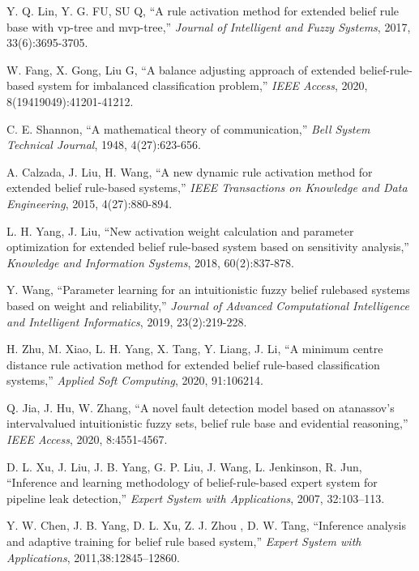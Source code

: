 \documentclass{ieeeaccess}
\begin{document}
\begin{thebibliography}{00}
     Y. Q. Lin, Y. G. FU, SU Q, ``A rule activation method for extended belief rule base with vp-tree and mvp-tree,''
    \emph{Journal of Intelligent and Fuzzy Systems},
    2017, 33(6):3695-3705.

     W. Fang, X. Gong, Liu G, ``A balance adjusting approach of extended
    belief-rule-based system for imbalanced classification problem,''
    \emph{IEEE Access},
    2020, 8(19419049):41201-41212.

     C. E. Shannon, ``A mathematical theory of communication,''
    \emph{Bell System Technical Journal},
    1948, 4(27):623-656.

     A. Calzada, J. Liu, H. Wang, ``A new dynamic rule activation
    method for extended belief rule-based systems,''
    \emph{IEEE Transactions on Knowledge and Data Engineering},
    2015, 4(27):880-894.

     L. H. Yang, J. Liu, ``New activation weight calculation and parameter optimization
    for extended belief rule-based system based on sensitivity analysis,''
    \emph{Knowledge and Information Systems},
    2018, 60(2):837-878.

     Y. Wang, ``Parameter learning for an intuitionistic fuzzy belief rulebased
    systems based on weight and reliability,''
    \emph{Journal of Advanced Computational Intelligence and Intelligent Informatics},
    2019, 23(2):219-228.

     H. Zhu, M. Xiao, L. H. Yang, X. Tang, Y. Liang, J. Li, ``A minimum centre distance rule activation method for extended
    belief rule-based classification systems,''
    \emph{Applied Soft Computing},
    2020, 91:106214.

     Q. Jia, J. Hu, W. Zhang, ``A novel fault detection model based on atanassov’s intervalvalued
    intuitionistic fuzzy sets, belief rule base and evidential reasoning,''
    \emph{IEEE Access}, 2020, 8:4551-4567.

     D. L. Xu, J. Liu, J. B. Yang, G. P. Liu, J. Wang, L. Jenkinson, R. Jun, ``Inference and learning methodology of belief-rule-based expert system for pipeline leak detection,''
    \emph{Expert System with Applications}, 2007, 32:103–113.

     Y. W. Chen, J. B. Yang, D. L. Xu, Z. J. Zhou , D. W. Tang, ``Inference analysis and adaptive training for belief rule based system,''
    \emph{Expert System with Applications}, 2011,38:12845–12860.


\end{thebibliography}
\end{document}
